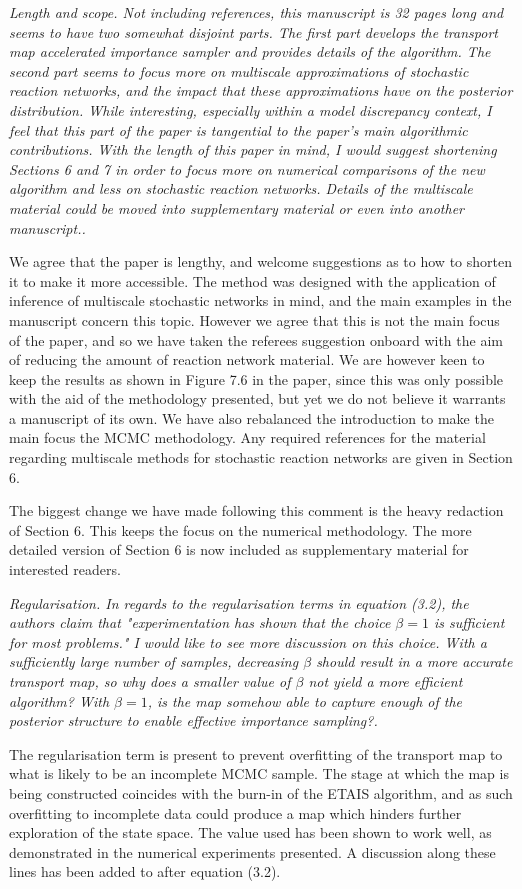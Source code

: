 \documentclass{article}
\newcommand{\comment}[2]{\vspace{0.6cm}{\bf Comment:} {\it #1.}

\vspace{0.3cm}{\bf Answer:} #2}
\begin{document}
\comment{Length and scope. Not including references, this manuscript is 32 pages long and seems to have two somewhat disjoint parts. The first part develops the transport map accelerated importance sampler and provides details of the algorithm. The second part seems to focus more on multiscale approximations of stochastic reaction networks, and the impact that these approximations have on the posterior distribution. While interesting, especially within a model discrepancy context, I feel that this part of the paper is tangential to the paper's main algorithmic contributions. With the length of this paper in mind, I would suggest shortening Sections 6 and 7 in order to focus more on numerical comparisons of the new algorithm and less on stochastic reaction networks. Details of the multiscale material could be moved into supplementary material or even into another manuscript.}{We agree that the paper is lengthy, and welcome suggestions as to how to shorten it to make it more accessible. The method was designed with the application of inference of multiscale stochastic networks in mind, and the main examples in the manuscript concern this topic. However we agree that this is not the main focus of the paper, and so we have taken the referees suggestion onboard with the aim of reducing the amount of reaction network material. We are however keen to keep the results as shown in Figure 7.6 in the paper, since this was only possible with the aid of the methodology presented, but yet we do not believe it warrants a manuscript of its own. We have also rebalanced the introduction to make the main focus the MCMC methodology. Any required references for the material regarding multiscale methods for stochastic reaction networks are given in Section 6.

The biggest change we have made following this comment is the heavy redaction of Section 6. This keeps the focus on the numerical methodology. The more detailed version of Section 6 is now included as supplementary material for interested readers.}


\comment{Regularisation. In regards to the regularisation terms in equation (3.2), the authors claim that "experimentation has shown that the choice $\beta=1$ is sufficient for most problems." I would like to see more discussion on this choice. With a sufficiently large number of samples, decreasing $\beta$ should result in a more accurate transport map, so why does a smaller value of $\beta$ not yield a more efficient algorithm? With $\beta=1$, is the map somehow able to capture enough of the posterior structure to enable effective importance sampling?}{The regularisation term is present to prevent overfitting of the transport map to what is likely to be an incomplete MCMC sample. The stage at which the map is being constructed coincides with the burn-in of the ETAIS algorithm, and as such overfitting to incomplete data could produce a map which hinders further exploration of the state space. The value used has been shown to work well, as demonstrated in the numerical experiments presented. A discussion along these lines has been added to after equation (3.2).}
\end{document}
